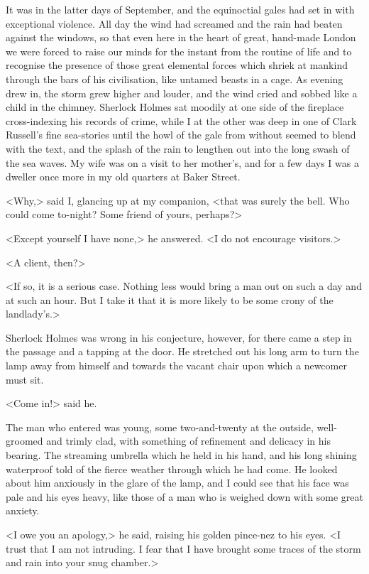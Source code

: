 It was in the latter days of September, and the equinoctial gales had set in with exceptional violence. All day the wind had screamed and the rain had beaten against the windows, so that even here in the heart of great, hand-made London we were forced to raise our minds for the instant from the routine of life and to recognise the presence of those great elemental forces which shriek at mankind through the bars of his civilisation, like untamed beasts in a cage. As evening drew in, the storm grew higher and louder, and the wind cried and sobbed like a child in the chimney. Sherlock Holmes sat moodily at one side of the fireplace cross-indexing his records of crime, while I at the other was deep in one of Clark Russell's fine sea-stories until the howl of the gale from without seemed to blend with the text, and the splash of the rain to lengthen out into the long swash of the sea waves. My wife was on a visit to her mother's, and for a few days I was a dweller once more in my old quarters at Baker Street.

<Why,> said I, glancing up at my companion, <that was surely the bell. Who could come to-night? Some friend of yours, perhaps?>

<Except yourself I have none,> he answered. <I do not encourage visitors.>

<A client, then?>

<If so, it is a serious case. Nothing less would bring a man out on such a day and at such an hour. But I take it that it is more likely to be some crony of the landlady's.>

Sherlock Holmes was wrong in his conjecture, however, for there came a step in the passage and a tapping at the door. He stretched out his long arm to turn the lamp away from himself and towards the vacant chair upon which a newcomer must sit.

<Come in!> said he.

The man who entered was young, some two-and-twenty at the outside, well-groomed and trimly clad, with something of refinement and delicacy in his bearing. The streaming umbrella which he held in his hand, and his long shining waterproof told of the fierce weather through which he had come. He looked about him anxiously in the glare of the lamp, and I could see that his face was pale and his eyes heavy, like those of a man who is weighed down with some great anxiety.

<I owe you an apology,> he said, raising his golden pince-nez to his eyes. <I trust that I am not intruding. I fear that I have brought some traces of the storm and rain into your snug chamber.>

